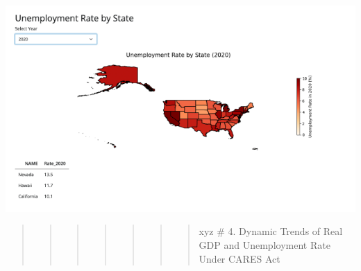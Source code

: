 \documentclass[
  letterpaper,
  DIV=11,
  numbers=noendperiod]{scrartcl}
\begin{document}
\includegraphics{finalproject_template_files/figure-pdf/cell-14-output-1.pdf}

\begin{quote}
\begin{quote}
\begin{quote}
\begin{quote}
\begin{quote}
\begin{quote}
\begin{quote}
xyz \# 4. Dynamic Trends of Real GDP and Unemployment Rate Under CARES
Act
\end{quote}
\end{quote}
\end{quote}
\end{quote}
\end{quote}
\end{quote}
\end{quote}
\end{document}
